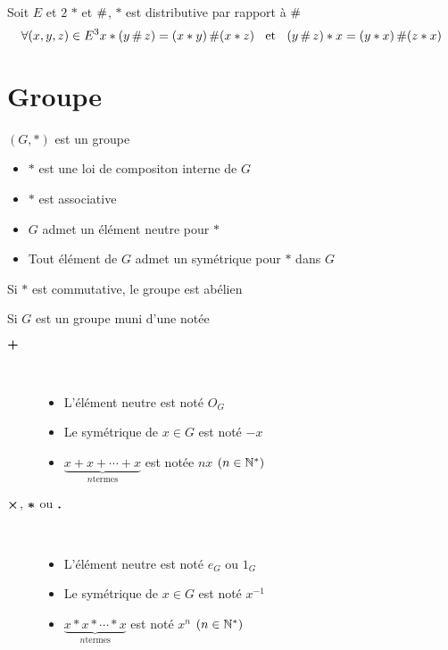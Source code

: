 \begin{dfn}
Soit $E$ et $2$ \lci $*$ et $\operatorname{\#}$, $*$ est distributive par rapport à
$\operatorname{\#}$ \ssi
\[
    \forall (x, y, z) \in E^3 \\
    x * (y \operatorname{\#} z) = (x * y) \operatorname{\#} (x * z) \;\;\text{ et }\;\; (y \operatorname{\#} z) * x = (y * x) \operatorname{\#} (z * x)
\]
\end{dfn}

\pagebreak

\section{Groupe}

\begin{dfn}[Groupe]
$(G, *)$ est un groupe \ssi
\begin{itemize}
    \item $*$ est une loi de compositon interne de $G$
    \item $*$ est associative
    \item $G$ admet un élément neutre pour $*$
    \item Tout élément de $G$ admet un symétrique pour $*$ dans $G$
\end{itemize}
Si $*$ est commutative, le groupe est abélien
\end{dfn}

\begin{dfn}
Si $G$ est un groupe muni d'une \lci notée
\begin{description}
    \item[$\boldsymbol{+}$] \quad \\
    \begin{itemize}
        \item L'élément neutre est noté $O_G$
        \item Le symétrique de $x \in G$ est noté $-x$
        \item $\underbrace{x + x + \dotsb + x}_{n \text{termes}}$
        est notée $nx$ $(n \in \mathbb{N}^*)$
    \end{itemize}
    \item[$\boldsymbol{\times}$, $\boldsymbol{*}$ ou $\boldsymbol{\operatorname{.}}$] \quad \\
    \begin{itemize}
        \item L'élément neutre est noté $e_G$ ou $1_G$
        \item Le symétrique de $x \in G$ est noté $x^{-1}$
        \item $\underbrace{x * x * \dotsb * x}_{n \text{termes}}$
        est noté $x^n$ $(n \in \mathbb{N}^*)$
    \end{itemize}
\end{description}
\end{dfn}

